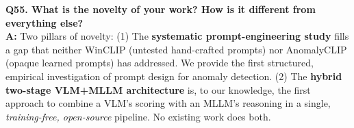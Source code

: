 \documentclass[12pt, a4paper]{article}
\begin{document}
\begin{qa}
\textbf{Q55. What is the novelty of your work? How is it different from everything else?}\\[4pt]
\textbf{A:} Two pillars of novelty: (1) The \textbf{systematic prompt-engineering study} fills a gap that neither WinCLIP (untested hand-crafted prompts) nor AnomalyCLIP (opaque learned prompts) has addressed. We provide the first structured, empirical investigation of prompt design for anomaly detection. (2) The \textbf{hybrid two-stage VLM+MLLM architecture} is, to our knowledge, the first approach to combine a VLM's scoring with an MLLM's reasoning in a single, \textit{training-free, open-source} pipeline. No existing work does both.
\end{qa}
\end{document}
